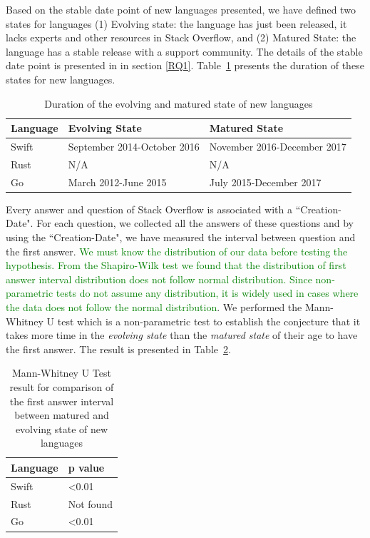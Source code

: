 Based on the stable date point of new languages presented, we have defined two states for languages (1) Evolving state: the language has just been released, it lacks experts and other resources in Stack Overflow, and (2) Matured State: the language has a stable release with a support community. The details of the stable date point is presented in  in section \ref{RQ1}. Table~\ref{table:States of languages} presents the duration of these states for new languages.
\begin{table}
\caption{Duration of the evolving and matured state of new languages}
\begin{tabular}{|l|l|l|}
\hline
 Language & Evolving State& Matured State \\ \hline
 Swift & September 2014-October 2016 & November 2016-December 2017  \\ \hline
 Rust & N/A & N/A \\ \hline
 Go & March 2012-June 2015 & July 2015-December 2017 \\ \hline
\end{tabular}%
\label{table:States of languages}
\end{table}
Every answer and question of Stack Overflow is associated with a ``Creation-Date". For each question, we collected all the answers of these questions and by using the ``Creation-Date", we have measured the interval between question and the first answer.
\textcolor{green}{ We must know the distribution  of our data before testing the hypothesis. From the Shapiro-Wilk test\citep{SHAPIRO1965} we found that the distribution of first answer interval distribution does not follow normal distribution. Since non-parametric tests do not assume any distribution, it is widely used in cases where the data does not follow the normal distribution\citep{Mann1947}}. We performed the Mann-Whitney U test which is a non-parametric test to establish the conjecture that it takes more time in the \emph{evolving state} than the \emph{matured state} of their age to have the first answer. The result is presented in Table~\ref{table:Mann-Whitney Test answer interval between states}.


\begin{table}
\centering
\caption{Mann-Whitney U Test result for comparison of the first answer interval between matured and evolving state of new languages}
\begin{tabular}{|l|l|}
\hline
 Language & p value \\ \hline
 Swift & \textless 0.01  \\ \hline
 Rust & Not found \\ \hline
 Go &   \textless 0.01 \\ \hline
\end{tabular}%
\label{table:Mann-Whitney Test answer interval between states}
\end{table}

